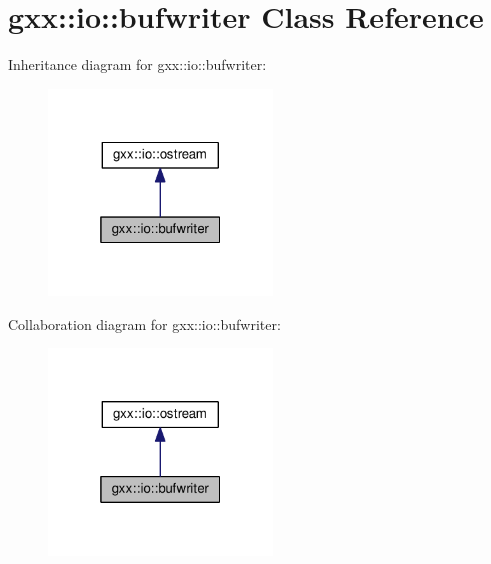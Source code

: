 \hypertarget{classgxx_1_1io_1_1bufwriter}{}\section{gxx\+:\+:io\+:\+:bufwriter Class Reference}
\label{classgxx_1_1io_1_1bufwriter}


Inheritance diagram for gxx\+:\+:io\+:\+:bufwriter\+:
\nopagebreak
\begin{figure}[H]
\begin{center}
\leavevmode
\includegraphics[width=169pt]{classgxx_1_1io_1_1bufwriter__inherit__graph}
\end{center}
\end{figure}


Collaboration diagram for gxx\+:\+:io\+:\+:bufwriter\+:
\nopagebreak
\begin{figure}[H]
\begin{center}
\leavevmode
\includegraphics[width=169pt]{classgxx_1_1io_1_1bufwriter__coll__graph}
\end{center}
\end{figure}
